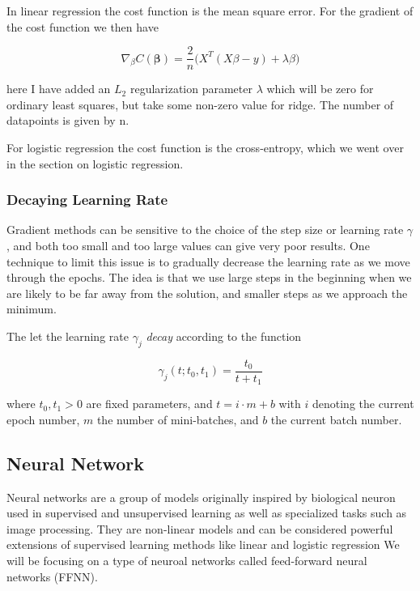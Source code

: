 \documentclass[11pt]{article}
\begin{document}
In linear regression the cost function is the mean square error. For the
gradient of the cost function we then have

\[
\nabla_{\beta} C(\mathbf{\beta}) = \frac{2}{n} \bigg( X^T (X\beta-y) + \lambda \beta \bigg)
\]

here I have added an \(L_2\) regularization parameter \(\lambda\) which
will be zero for ordinary least squares, but take some non-zero value
for ridge. The number of datapoints is given by n.~

For logistic regression the cost function is the cross-entropy, which we
went over in the section on logistic regression.

\hypertarget{decaying-learning-rate}{%
\subsubsection{Decaying Learning Rate}\label{decaying-learning-rate}}

Gradient methods can be sensitive to the choice of the step size or
learning rate \(\gamma\), and both too small and too large values can
give very poor results. One technique to limit this issue is to
gradually decrease the learning rate as we move through the epochs. The
idea is that we use large steps in the beginning when we are likely to
be far away from the solution, and smaller steps as we approach the
minimum.

The let the learning rate \(\gamma_j\) \emph{decay} according to the
function

\[
\gamma_j(t; t_0, t_1) = \frac{t_0}{t+t_1} 
\]

where \(t_0, t_1 > 0\) are fixed parameters, and \(t=i \cdot m + b\)
with \(i\) denoting the current epoch number, \(m\) the number of
mini-batches, and \(b\) the current batch number.

    \hypertarget{neural-network}{%
\subsection{Neural Network}\label{neural-network}}

Neural networks are a group of models originally inspired by biological
neuron used in supervised and unsupervised learning as well as
specialized tasks such as image processing. They are non-linear models
and can be considered powerful extensions of supervised learning methods
like linear and logistic regression We will be focusing on a type of
neuroal networks called feed-forward neural networks (FFNN).
\end{document}
